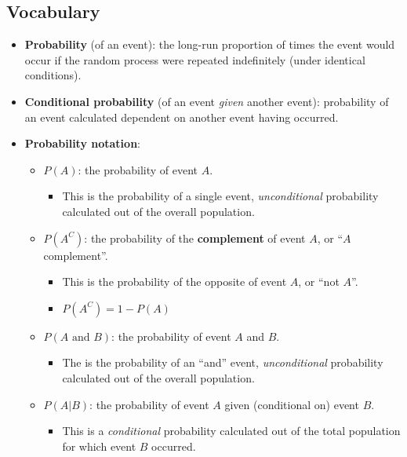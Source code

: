 \documentclass[
]{report}
\providecommand{\tightlist}{%
  \setlength{\itemsep}{0pt}\setlength{\parskip}{0pt}}
\begin{document}
\subsection{Vocabulary}\label{vocabulary-1}

\begin{itemize}
\item
  \textbf{Probability} (of an event): the long-run proportion of times the event would occur if the random process were repeated indefinitely (under identical conditions).
\item
  \textbf{Conditional probability} (of an event \emph{given} another event): probability of an event calculated dependent on another event having occurred.
\item
  \textbf{Probability notation}:

  \begin{itemize}
  \item
    \(P(A)\): the probability of event \(A\).

    \begin{itemize}
    \tightlist
    \item
      This is the probability of a single event, \emph{unconditional} probability calculated out of the overall population.
    \end{itemize}
  \item
    \(P(A^C)\): the probability of the \textbf{complement} of event \(A\), or ``\(A\) complement''.

    \begin{itemize}
    \item
      This is the probability of the opposite of event \(A\), or ``not \(A\)''.
    \item
      \(P(A^C) = 1 - P(A)\)
    \end{itemize}
  \item
    \(P(A\text{ and }B)\): the probability of event \(A\) and \(B\).

    \begin{itemize}
    \tightlist
    \item
      The is the probability of an ``and'' event, \emph{unconditional} probability calculated out of the overall population.
    \end{itemize}
  \item
    \(P(A|B)\): the probability of event \(A\) given (conditional on) event \(B\).

    \begin{itemize}
    \tightlist
    \item
      This is a \emph{conditional} probability calculated out of the total population for which event \(B\) occurred.
    \end{itemize}
  \end{itemize}
\end{itemize}
\end{document}
